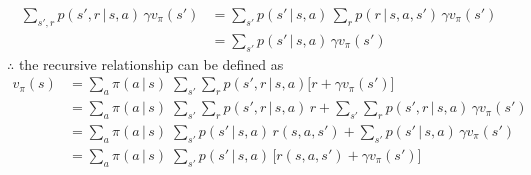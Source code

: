 \documentclass{article}
\begin{document}
\begin{enumerate}
\begin{equation*}
	\begin{split}
	\sum_{s',r}p(s',r\,|\,s,a)\,\gamma v_\pi(s') &= \sum_{s'}p(s'\,|\,s,a)\,\sum_r p(r\, |\, s,a,s')\,\gamma v_\pi(s')\\
	&= \sum_{s'}p(s'\,|\,s,a)\,\gamma v_\pi(s')
	\end{split}
	\end{equation*}
	$\therefore$ the recursive relationship can be defined as 
	\begin{equation*}
	\begin{split}
	v_\pi(s) &= \sum_a\pi (a \,|\, s)\;\sum_{s'}\sum_r p(s',r\,|\,s,a)\big[r + \gamma v_\pi(s')\big]\\
	&= \sum_a\pi (a \,|\, s)\;\sum_{s'}\sum_r p(s',r\,|\,s,a)\,r + \sum_{s'}\sum_r p(s',r\,|\,s,a)\,\gamma v_\pi(s')\\
	&= \sum_a\pi (a \,|\, s)\;\sum_{s'} p(s'\,|\,s,a)\,r(s,a,s') + \sum_{s'} p(s'\,|\,s,a)\,\gamma v_\pi(s')\\
	&= \sum_a\pi (a \,|\, s)\;\sum_{s'} p(s'\,|\,s,a)\,\big[r(s,a,s') + \gamma v_\pi(s')\big]
	\end{split}
	\end{equation*}
\end{enumerate}
\end{document}
